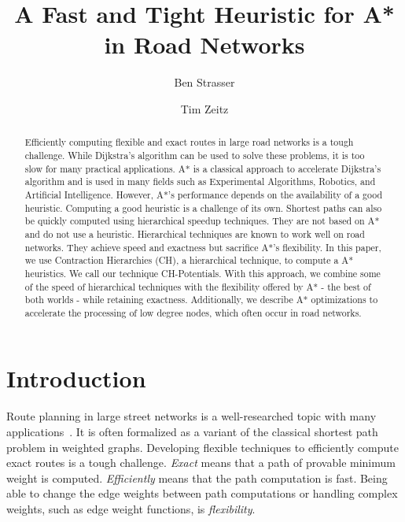 \documentclass[a4paper,USenglish,cleveref, autoref, thm-restate]{lipics-v2019}
\title{A Fast and Tight Heuristic for A* in Road Networks}
\author{Ben Strasser}{Germany}{academia@ben-strasser.net}{}{}
\author{Tim Zeitz}{Karlsruhe Institute of Technology, Germany}{tim.zeitz@kit.edu}{https://orcid.org/0000-0003-4746-3582}{}
\begin{document}
\maketitle


\begin{abstract}
Efficiently computing flexible and exact routes in large road networks is a tough challenge.
While Dijkstra's algorithm can be used to solve these problems, it is too slow for many practical applications.
A* is a classical approach to accelerate Dijkstra's algorithm and is used in many fields such as Experimental Algorithms, Robotics, and Artificial Intelligence.
However, A*'s performance depends on the availability of a good heuristic.
Computing a good heuristic is a challenge of its own.
Shortest paths can also be quickly computed using hierarchical speedup techniques.
They are not based on A* and do not use a heuristic.
Hierarchical techniques are known to work well on road networks.
They achieve speed and exactness but sacrifice A*'s flexibility.
In this paper, we use Contraction Hierarchies (CH), a hierarchical technique, to compute a A* heuristics.
We call our technique CH-Potentials.
With this approach, we combine some of the speed of hierarchical techniques with the flexibility offered by A* - the best of both worlds - while retaining exactness.
Additionally, we describe A* optimizations to accelerate the processing of low degree nodes, which often occur in road networks.
\end{abstract}

\section{Introduction}
\label{sec:intro}
Route planning in large street networks is a well-researched topic with many applications~\cite{bdgmpsww-rptn-16}.
It is often formalized as a variant of the classical shortest path problem in weighted graphs.
Developing flexible techniques to efficiently compute exact routes is a tough challenge.
\emph{Exact} means that a path of provable minimum weight is computed.
\emph{Efficiently} means that the path computation is fast.
Being able to change the edge weights between path computations or handling complex weights, such as edge weight functions, is \emph{flexibility}. %
\end{document}
